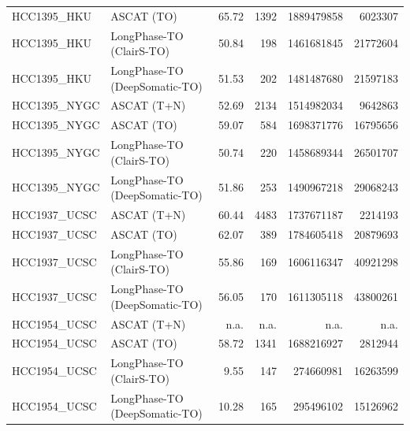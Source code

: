 \documentclass[pdflatex,sn-nature]{sn-jnl}
\begin{document}
\begin{table}[htbp]
\begin{tabular}{llrrrr}
    HCC1395\_HKU   & ASCAT (TO)                   & 65.72 & 1392 & 1889479858 &  6023307  \\
    HCC1395\_HKU   & LongPhase-TO (ClairS-TO)      & 50.84 & 198  & 1461681845 & 21772604  \\
    HCC1395\_HKU   & LongPhase-TO (DeepSomatic-TO) & 51.53 & 202  & 1481487680 & 21597183  \\
    HCC1395\_NYGC  & ASCAT (T+N)                  & 52.69 & 2134 & 1514982034 &  9642863  \\
    HCC1395\_NYGC  & ASCAT (TO)                   & 59.07 & 584  & 1698371776 & 16795656  \\
    HCC1395\_NYGC  & LongPhase-TO (ClairS-TO)      & 50.74 & 220  & 1458689344 & 26501707  \\
    HCC1395\_NYGC  & LongPhase-TO (DeepSomatic-TO) & 51.86 & 253  & 1490967218 & 29068243  \\
    HCC1937\_UCSC  & ASCAT (T+N)                  & 60.44 & 4483 & 1737671187 &  2214193  \\
    HCC1937\_UCSC  & ASCAT (TO)                   & 62.07 & 389  & 1784605418 & 20879693  \\
    HCC1937\_UCSC  & LongPhase-TO (ClairS-TO)      & 55.86 & 169  & 1606116347 & 40921298  \\
    HCC1937\_UCSC  & LongPhase-TO (DeepSomatic-TO) & 56.05 & 170  & 1611305118 & 43800261  \\
    HCC1954\_UCSC  & ASCAT (T+N)                  & n.a. & n.a. & n.a. & n.a. \\
    HCC1954\_UCSC  & ASCAT (TO)                   & 58.72 & 1341 & 1688216927 &  2812944  \\
    HCC1954\_UCSC  & LongPhase-TO (ClairS-TO)      & 9.55 & 147  &  274660981 & 16263599  \\
    HCC1954\_UCSC  & LongPhase-TO (DeepSomatic-TO) & 10.28 & 165  &  295496102 & 15126962  \\
    \bottomrule
  \end{tabular}
\end{table}
\end{document}

